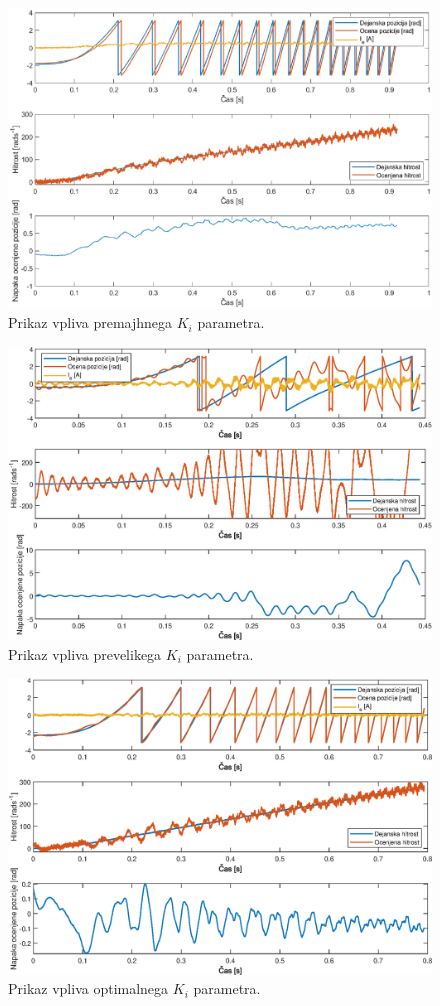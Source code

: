 \documentclass[a4paper,twoside,openright,12pt,slovene]{book}
\begin{document}
\begin{figure}[!htbp]
    \centering
    \includegraphics[width=1\columnwidth]{Slike/PItuning_Ki_unstableLow.eps}
    \caption{\label{PItuning_Ki_unstableLow} Prikaz vpliva premajhnega $K_i$ parametra. }
\end{figure}

\begin{figure}[!htbp]
    \centering
    \includegraphics[width=1\columnwidth]{Slike/PItuning_Ki_unstableHigh.eps}
    \caption{\label{PItuning_Ki_unstableHigh} Prikaz vpliva prevelikega $K_i$ parametra. }
\end{figure}

\begin{figure}[!htbp]
    \centering
    \includegraphics[width=1\columnwidth]{Slike/PItuning_Ki_stable.eps}
    \caption{\label{PItuning_Ki_stable} Prikaz vpliva optimalnega $K_i$ parametra. }
\end{figure}
\end{document}

